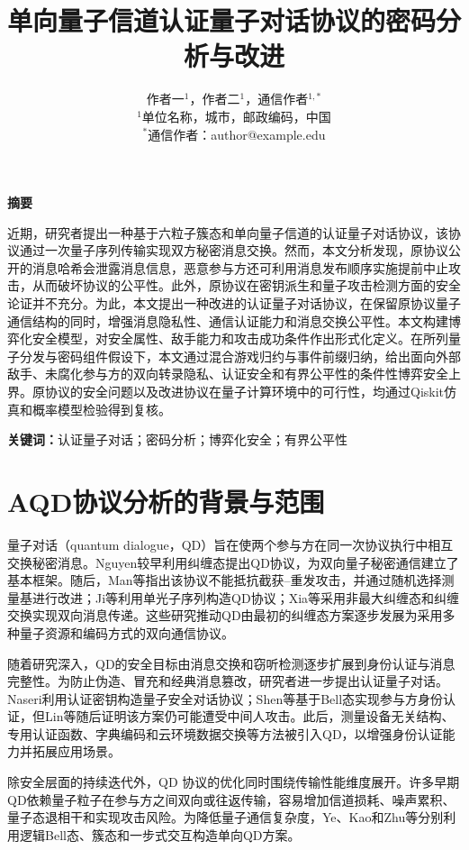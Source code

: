 \documentclass[UTF8,10pt,a4paper]{ctexart}
\title{单向量子信道认证量子对话协议的密码分析与改进}
\author{作者一$^{1}$，作者二$^{1}$，通信作者$^{1,*}$\\
\small $^{1}$单位名称，城市，邮政编码，中国\\
\small $^{*}$通信作者：author@example.edu}
\date{}
\theoremstyle{aqdplain}
\renewenvironment{abstract}{%
  \par\begin{center}\zihao{-4}\bfseries 摘要\end{center}%
  \zihao{5}\setlength{\parindent}{2em}\ignorespaces
}{\par}
\begin{document}
\maketitle

\begin{abstract}
近期，研究者提出一种基于六粒子簇态和单向量子信道的认证量子对话协议，该协议通过一次量子序列传输实现双方秘密消息交换。然而，本文分析发现，原协议公开的消息哈希会泄露消息信息，恶意参与方还可利用消息发布顺序实施提前中止攻击，从而破坏协议的公平性。此外，原协议在密钥派生和量子攻击检测方面的安全论证并不充分。为此，本文提出一种改进的认证量子对话协议，在保留原协议量子通信结构的同时，增强消息隐私性、通信认证能力和消息交换公平性。本文构建博弈化安全模型，对安全属性、敌手能力和攻击成功条件作出形式化定义。在所列量子分发与密码组件假设下，本文通过混合游戏归约与事件前缀归纳，给出面向外部敌手、未腐化参与方的双向转录隐私、认证安全和有界公平性的条件性博弈安全上界。原协议的安全问题以及改进协议在量子计算环境中的可行性，均通过Qiskit仿真和概率模型检验得到复核。
\end{abstract}

\par\noindent{}\textbf{关键词：}认证量子对话；密码分析；博弈化安全；有界公平性

\twocolumn
\section{AQD协议分析的背景与范围}
\label{sec:introduction}

量子对话（quantum dialogue，QD）旨在使两个参与方在同一次协议执行中相互交换秘密消息。Nguyen较早利用纠缠态提出QD协议，为双向量子秘密通信建立了基本框架\citep{nguyen2004qd}。随后，Man等指出该协议不能抵抗截获--重发攻击，并通过随机选择测量基进行改进\citep{man2005revisited}；Ji等利用单光子序列构造QD协议\citep{ji2006single}；Xia等采用非最大纠缠态和纠缠交换实现双向消息传递\citep{xia2007nonmax}。这些研究推动QD由最初的纠缠态方案逐步发展为采用多种量子资源和编码方式的双向通信协议。

随着研究深入，QD的安全目标由消息交换和窃听检测逐步扩展到身份认证与消息完整性。为防止伪造、冒充和经典消息篡改，研究者进一步提出认证量子对话。Naseri利用认证密钥构造量子安全对话协议\citep{naseri2011auth}；Shen等基于Bell态实现参与方身份认证，但Lin等随后证明该方案仍可能遭受中间人攻击\citep{shen2013auth,lin2013mitm}。此后，测量设备无关结构、专用认证函数、字典编码和云环境数据交换等方法被引入QD，以增强身份认证能力并拓展应用场景\citep{maitra2017mdi,feng2021auth,meng2023cloud}。

除安全层面的持续迭代外，QD 协议的优化同时围绕传输性能维度展开。许多早期QD依赖量子粒子在参与方之间双向或往返传输，容易增加信道损耗、噪声累积、量子态退相干和实现攻击风险。为降低量子通信复杂度，Ye、Kao和Zhu等分别利用逻辑Bell态、簇态和一步式交互构造单向QD方案\citep{ye2015oneway,kao2017controlled,zhu2024onestep}。
\end{document}
